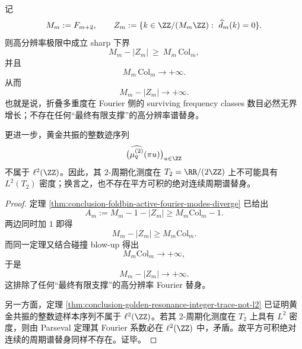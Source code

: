 \begin{theorem}\label{thm:conclusion-collision-blowup-spectral-antidilution}
记
\[
M_m:=F_{m+2},
\qquad
Z_m:=\{k\in \ZZ/(M_m\ZZ):\ \widehat d_m(k)=0\}.
\]
则高分辨率极限中成立 sharp 下界
\[
M_m-|Z_m|\ \ge\ M_m\,\mathrm{Col}_m,
\]
并且
\[
M_m\,\mathrm{Col}_m\longrightarrow +\infty.
\]
从而
\[
M_m-|Z_m|\longrightarrow +\infty.
\]
也就是说，折叠多重度在 Fourier 侧的 surviving frequency classes 数目必然无界增长；不存在任何“最终有限支撑”的高分辨率谱替身。

更进一步，黄金共振的整数迹序列
\[
\bigl(\widehat{\mu_q^{(2)}}(\pi u)\bigr)_{u\in\ZZ}
\]
不属于 \(\ell^2(\ZZ)\)。因此，其 \(2\)-周期化测度在 \(T_2=\RR/(2\ZZ)\) 上不可能具有 \(L^2(T_2)\) 密度；换言之，也不存在平方可积的绝对连续周期谱替身。
\end{theorem}
\begin{proof}
定理 \ref{thm:conclusion-foldbin-active-fourier-modes-diverge} 已给出
\[
A_m:=M_m-1-|Z_m|\ge M_m\mathrm{Col}_m-1.
\]
两边同时加 \(1\) 即得
\[
M_m-|Z_m|\ge M_m\mathrm{Col}_m.
\]
而同一定理又结合碰撞 blow-up 得出
\[
M_m\mathrm{Col}_m\to+\infty,
\]
于是
\[
M_m-|Z_m|\to+\infty.
\]
这排除了任何“最终有限支撑”的高分辨率 Fourier 替身。

另一方面，定理 \ref{thm:conclusion-golden-resonance-integer-trace-not-l2} 已证明黄金共振的整数迹样本序列不属于 \(\ell^2(\ZZ)\)。若其 \(2\)-周期化测度在 \(T_2\) 上具有 \(L^2\) 密度，则由 Parseval 定理其 Fourier 系数必在 \(\ell^2(\ZZ)\) 中，矛盾。故平方可积绝对连续的周期谱替身同样不存在。证毕。
\end{proof}

